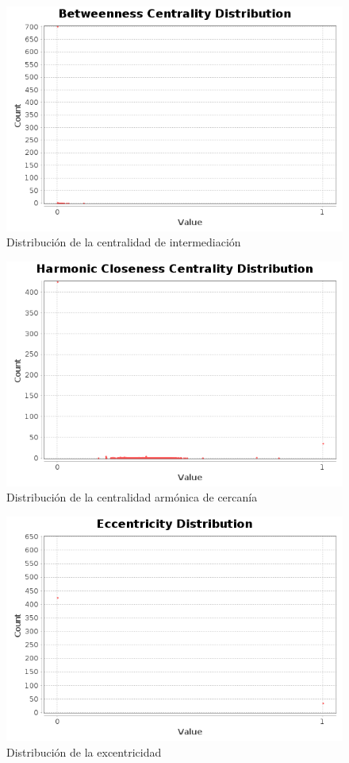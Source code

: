 \begin{figure}
    \includegraphics[width=\textwidth]{images/visualization/plots/betweenness-centrality-distribution.png}
    \caption{Distribución de la centralidad de intermediación}
    \label{fig:plot-betweenness-centrality-distribution}
\end{figure}

\begin{figure}
    \includegraphics[width=\textwidth]{images/visualization/plots/harmonic-closeness-centrality-distribution.png}
    \caption{Distribución de la centralidad armónica de cercanía}
    \label{fig:plot-harmonic-closeness-centrality-distribution}
\end{figure}

\begin{figure}
    \includegraphics[width=\textwidth]{images/visualization/plots/eccentricity-distribution.png}
    \caption{Distribución de la excentricidad}
    \label{fig:plot-eccentricity-distribution}
\end{figure}
